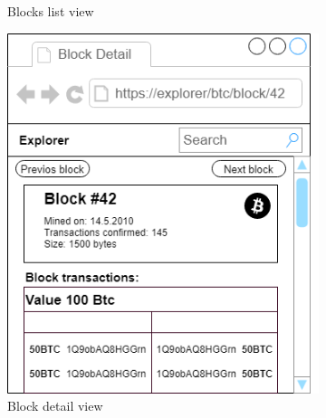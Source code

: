 \begin{figure}[h]
\begin{subfigure}{.5\textwidth}
        \caption{Blocks list view}
        \label{blocksMockup}
    \end{subfigure}
    \begin{subfigure}{.5\textwidth}
        \centering
        \includegraphics[width=1.0\linewidth]{mockups/blockDetail.png}
        \caption{Block detail view}
        \label{blockDetailMockup}
    \end{subfigure}
    \begin{subfigure}{.5\textwidth}
        \centering

\end{subfigure}
\end{figure}
